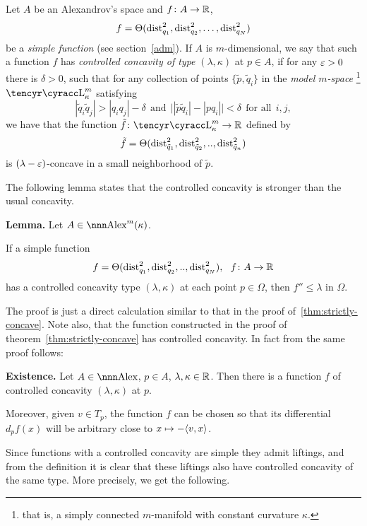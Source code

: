\documentclass{article}
\begin{document}
Let $A$ be an Alexandrov's space and $f\colon A\to \mathbb{R}$,
$$f=\Theta(\operatorname{dist}^2_{q_1},\operatorname{dist}^2_{q_2},\dots,\operatorname{dist}^2_{q_N})$$ be a \emph{simple
function} (see section~\ref{adm}).
If $A$ is $m$-dimensional, we say that such a function $f$ has \emph{controlled
concavity of type} $(\lambda,\kappa)$ at $p\in A$, if for any $\varepsilon>0$ there is
$\delta>0$, such that for any collection of points $\{\tilde p,\tilde q_i\}$ in
the \emph{model $m$-space}%
\footnote{that is, a simply connected $m$-manifold with
constant curvature $\kappa$.} $\Lob_\kappa^m$  satisfying 
$$|\tilde q_i\tilde q_j|> |q_i  q_j|-\delta\ \ \text{and}\ \  \bigl||\tilde
p\tilde q_i|-|p q_i|\bigr|<\delta \ \ \text{for all}\ \ i,j,$$ 
we have that the function 
$\tilde f\:\Lob_\kappa^m\to \RR$ defined by 
$$\tilde f=\Theta(\operatorname{dist}^2_{\tilde q_1},\operatorname{dist}^2_{\tilde q_2},..,\operatorname{dist}^2_{\tilde
q_n})$$
is $(\lambda-\varepsilon)$-concave in a small neighborhood of $\tilde p$.

The following lemma states that the controlled concavity is stronger than the usual
concavity.

\begin{thm}{\bf Lemma.} \label{contr-concave}
Let $A\in\Alex^m(\kappa)$.

If a simple function 
$$f=\Theta(\dist^2_{q_1},\dist^2_{q_2},..,\dist^2_{q_N}),\ \ f\:A\to\RR$$ 
has a controlled concavity type $(\lambda,\kappa)$ at each point $p\in \Omega$, then
$f''\le \lambda$ in $\Omega$. 
\end{thm}

The proof is just a direct calculation similar to that in the proof
of~\ref{thm:strictly-concave}. 
Note also, that the function constructed in the proof of
theorem~\ref{thm:strictly-concave} has controlled concavity.
In fact from the
same proof follows:

\begin{thm}{\bf Existence.} \label{exist-control}
Let $A\in\Alex$, $p\in A$, $\lambda,\kappa\in\mathbb{R}$.
Then there is a function $f$ of controlled concavity $(\lambda,\kappa)$
at $p$.

Moreover, given $v\in T_p$, the function $f$ can be chosen so that its differential $d_p f(x)$ will be arbitrary close to $x\mapsto -\langle v,x\rangle$.
\end{thm}

Since functions with a controlled concavity are simple they admit liftings, and
from the definition it is clear that these liftings also have controlled
concavity of the same type.
More precisely, we get the following.
\end{document}
